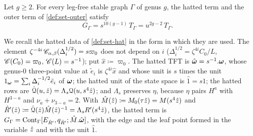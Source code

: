 \begin{lem}[hatting]
\label{lem:flh-hat}
Let $g\geq 2$. For every leg-free stable graph $\Gamma$ of genus $g$, the hatted term and the outer term of \cref{def:set-outer} satisfy
\[
G_\Gamma=s^{10(g-1)}\,T_\Gamma=u^{2g-2}\,T_\Gamma .
\]
\end{lem}

We recall the hatted data of \cref{def:set-hat} in the form in which they are used. The element $\zeta^{-4i}\,\mathscr{C}_{\alpha,\beta}(\Delta_i^{1/2})=s\varpi_0$ does not depend on $i$ ($\Delta_i^{1/2}=\zeta^{4i}C_0/L$, $\mathscr{C}(C_0)=\varpi_0$, $\mathscr{C}(L)=s^{-1}$); put $\hat x\coloneqq\varpi_0$. The hatted TFT is $\hat{\boldsymbol{\omega}}=s^{-1}.\boldsymbol{\omega}$, whose genus-$0$ three-point value at $\tilde e_i$ is $\zeta^{4i}\hat x$ and whose unit is $s$ times the unit $1_{\boldsymbol{\omega}}=\sum_i\Delta_i^{-1/2}\tilde e_i$ of $\boldsymbol{\omega}$; the hatted unit of the state space is $\hat1=s1$; the hatted rows are $\hat{\mathcal{Q}}(u,\hat{z})=\Lambda_s\mathcal{Q}(u,s^4\hat{z})$; and $\Lambda_s$ preserves $\eta$, because $\eta$ pairs $H^a$ with $H^{3-a}$ and $\nu_a+\nu_{3-a}=2$. With $\hat M(\hat{z})\coloneqq M_{0}(\tau\hat{z})=M(s^4\hat{z})$ and $\hat R'(\hat{z})\coloneqq\hat{\mathcal{Q}}(\hat{z})\hat M(\hat{z})^{-1}=\Lambda_sR'(s^4\hat{z})$, the hatted term is $G_\Gamma=\mathrm{Cont}_\Gamma[E_{\hat R'},q_{\hat R'};\hat M.\hat{\boldsymbol{\omega}}]$, with the edge and the leaf point formed in the variable $\hat{z}$ and with the unit $\hat1$.

